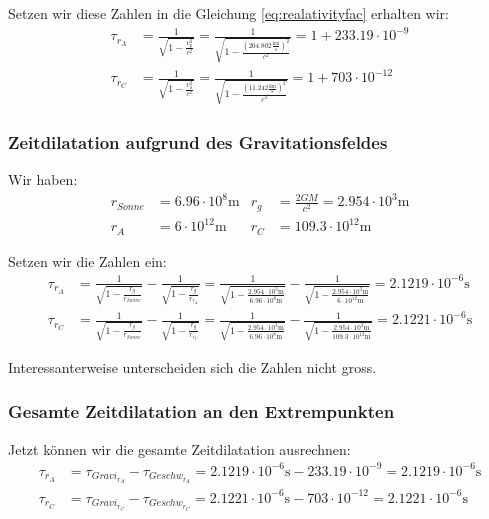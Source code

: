 \begin{refsection}
\noindent{}Setzen wir diese Zahlen in die Gleichung \eqref{eq:realativityfac} erhalten wir:
\begin{align*}
\tau_{r_A} & = \frac{1}{\sqrt{1 - \frac{v_{p}^2}{c^2}}} = \frac{1}{\sqrt{1 - \frac{(204.802 \frac{\text{km}}{\text{s}})^2}{c^2}}} = 1 + 233.19 \cdot 10^{-9}
\\
\tau_{r_C} & = \frac{1}{\sqrt{1 - \frac{v_{a}^2}{c^2}}} = \frac{1}{\sqrt{1 - \frac{(11.242 \frac{\text{km}}{\text{s}})^2}{c^2}}} =  1 + 703 \cdot 10^{-12}
\end{align*}

\subsubsection{Zeitdilatation aufgrund des Gravitationsfeldes}
Wir haben:
\begin{align*}
 r_{Sonne} &= 6.96 \cdot 10^8\text{m} & r_g &= \frac{2GM}{c^2} = 2.954 \cdot 10^3\text{m}
\\
r_A & = 6\cdot 10^{12}\text{m} & r_C &= 109.3\cdot 10^{12}\text{m}
\end{align*}

\noindent{}Setzen wir die Zahlen ein:
\begin{align*}
\tau_{r_A} &= \frac{1}{\sqrt{1-\frac{r_g}{r_{Sonne}}}} - \frac{1}{\sqrt{1-\frac{r_g}{r_{r_A}}}} =  
\frac{1}{\sqrt{1-\frac{2.954 \cdot 10^3\text{m}}{6.96 \cdot 10^8\text{m}}}} - \frac{1}{\sqrt{1-\frac{2.954 \cdot 10^3\text{m}}{ 6\cdot 10^{12}\text{m} }}} =  2.1219 \cdot 10^{-6}\text{s}
\\
\tau_{r_C} &= \frac{1}{\sqrt{1-\frac{r_g}{r_{Sonne}}}} - \frac{1}{\sqrt{1-\frac{r_g}{r_{r_C}}}} =  
\frac{1}{\sqrt{1-\frac{2.954 \cdot 10^3\text{m}}{6.96 \cdot 10^8\text{m}}}} - \frac{1}{\sqrt{1-\frac{2.954 \cdot 10^3\text{m}}{ 109.3\cdot 10^{12}\text{m} }}} =  2.1221 \cdot 10^{-6}\text{s}
\end{align*}

\noindent{}Interessanterweise unterscheiden sich die Zahlen nicht gross.

\subsubsection{Gesamte Zeitdilatation an den Extrempunkten}
Jetzt können wir die gesamte Zeitdilatation ausrechnen:
\begin{align*}
\tau_{r_A} & = \tau_{Gravi_{r_A}} - \tau_{Geschw_{r_A}} = 2.1219 \cdot 10^{-6}\text{s} - 233.19 \cdot 10^{-9} = 2.1219 \cdot 10^{-6}\text{s}
\\
\tau_{r_C} & = \tau_{Gravi_{r_C}} - \tau_{Geschw_{r_C}} = 2.1221 \cdot 10^{-6}\text{s} - 703 \cdot 10^{-12} = 2.1221 \cdot 10^{-6}\text{s}
\end{align*}


\end{refsection}
